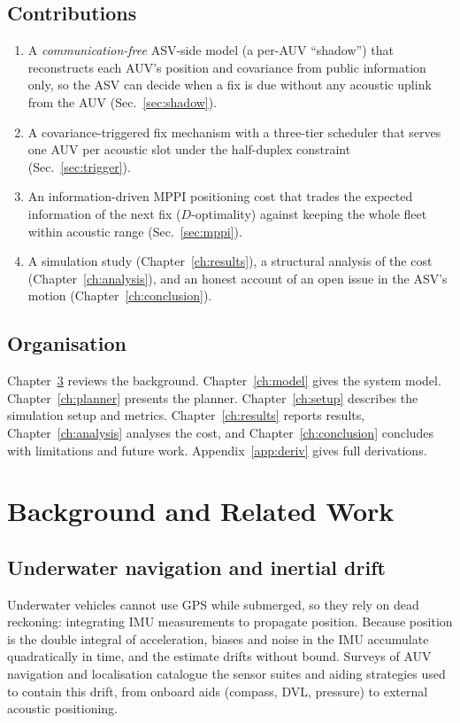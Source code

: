 \documentclass[12pt,a4paper,oneside]{book}
\newcommand{\secref}[1]{Sec.~\ref{#1}}
\newcommand{\chapref}[1]{Chapter~\ref{#1}}
\begin{document}
\section{Contributions}
\begin{enumerate}
\item A \emph{communication-free} ASV-side model (a per-AUV ``shadow'') that reconstructs each AUV's
position and covariance from public information only, so the ASV can decide when a fix is due without any
acoustic uplink from the AUV (\secref{sec:shadow}).
\item A covariance-triggered fix mechanism with a three-tier scheduler that serves one AUV per acoustic slot
under the half-duplex constraint (\secref{sec:trigger}).
\item An information-driven MPPI positioning cost that trades the expected information of the next fix
($D$-optimality) against keeping the whole fleet within acoustic range (\secref{sec:mppi}).
\item A simulation study (\chapref{ch:results}), a structural analysis of the cost (\chapref{ch:analysis}),
and an honest account of an open issue in the ASV's motion (\chapref{ch:conclusion}).
\end{enumerate}

\section{Organisation}
\chapref{ch:background} reviews the background. \chapref{ch:model} gives the system model.
\chapref{ch:planner} presents the planner. \chapref{ch:setup} describes the simulation setup and metrics.
\chapref{ch:results} reports results, \chapref{ch:analysis} analyses the cost, and \chapref{ch:conclusion}
concludes with limitations and future work. Appendix~\ref{app:deriv} gives full derivations.

\chapter{Background and Related Work}
\label{ch:background}

\section{Underwater navigation and inertial drift}
Underwater vehicles cannot use GPS while submerged, so they rely on dead reckoning: integrating IMU
measurements to propagate position. Because position is the double integral of acceleration, biases and
noise in the IMU accumulate quadratically in time, and the estimate drifts without bound. Surveys of AUV
navigation and localisation \cite{kinsey2006survey,paull2014auv} catalogue the sensor suites and aiding
strategies used to contain this drift, from onboard aids (compass, DVL, pressure) to external acoustic
positioning.
\end{document}
